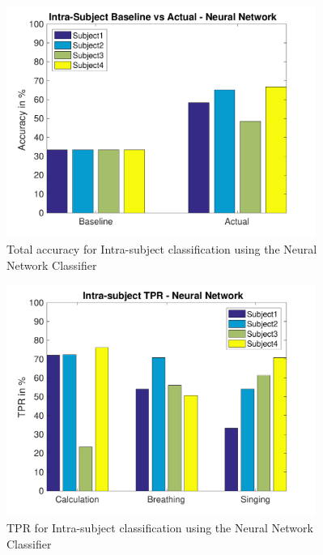         \begin{figure}[hbtp]
	    	\centering
	    	\includegraphics[width=0.90\textwidth]{Chapter-4/base_tn}
	    	\caption{Total accuracy for Intra-subject classification using the Neural Network Classifier}
	    	\label{fig:chap4IntraNT}
    	\end{figure}

    	\begin{figure}[hbtp]
	    	\centering
	    	\includegraphics[width=0.90\textwidth]{Chapter-4/base_tprn}
	    	\caption{TPR for Intra-subject classification using the Neural Network Classifier}
	    	\label{fig:chap4IntraNTPR}
    	\end{figure}

